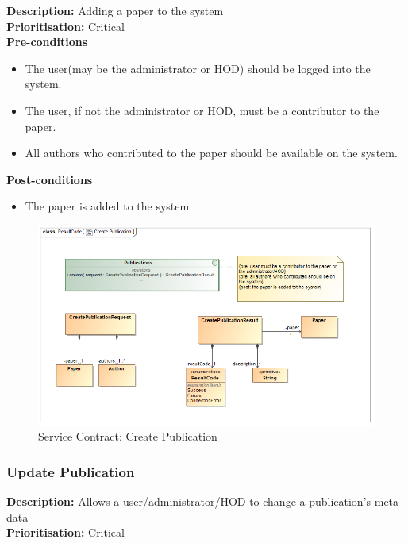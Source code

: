 \documentclass[a4paper]{article}
\begin{document}
    \textbf{Description:} Adding a paper to the system\\
    \textbf{Prioritisation:} Critical\\
    
    
    \textbf{Pre-conditions}
     \begin{itemize}
        \item The user(may be the administrator or HOD) should be logged into the system.
        \item The user, if not the administrator or HOD, must be a contributor to the paper.
        \item All authors who contributed to the paper should be available on the system.
   \end{itemize}
    
    \textbf{Post-conditions}
    \begin{itemize}
        \item The paper is added to the system
    \end{itemize}
    
        	\begin{figure}[H]
        		\centering
        		\includegraphics[width=\textwidth]{5.1.5.Create.Publication.Services.Contract.png}
        		\caption{Service Contract: Create Publication}
        	\end{figure}
\pagebreak
    \subsubsection{Update Publication}
    
    \textbf{Description:} Allows a user/administrator/HOD to change a publication's meta-data\\
    \textbf{Prioritisation:} Critical\\
    \\
    
\end{document}
